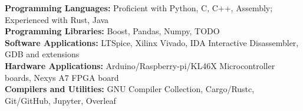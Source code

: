 \textbf{Programming Languages:} Proficient with Python, C, C++, Assembly; Experienced with Rust, Java\\
\textbf{Programming Libraries:} Boost, Pandas, Numpy, TODO\\
\textbf{Software Applications:} LTSpice, Xilinx Vivado, IDA Interactive Disassembler, GDB and extensions\\
\textbf{Hardware Applications:} Arduino/Raspberry-pi/KL46X Microcontroller boards, Nexys A7 FPGA board\\
\textbf{Compilers and Utilities:} GNU Compiler Collection, Cargo/Rustc, Git/GitHub, Jupyter, Overleaf

